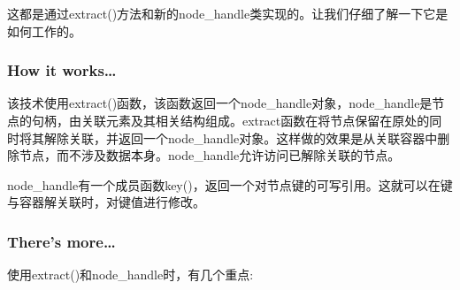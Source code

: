 这都是通过extract()方法和新的node\_handle类实现的。让我们仔细了解一下它是如何工作的。

\subsubsection{How it works…}

该技术使用extract()函数，该函数返回一个node\_handle对象，node\_handle是节点的句柄，由关联元素及其相关结构组成。extract函数在将节点保留在原处的同时将其解除关联，并返回一个node\_handle对象。这样做的效果是从关联容器中删除节点，而不涉及数据本身。node\_handle允许访问已解除关联的节点。

node\_handle有一个成员函数key()，返回一个对节点键的可写引用。这就可以在键与容器解关联时，对键值进行修改。

\subsubsection{There's more…}

使用extract()和node\_handle时，有几个重点:

